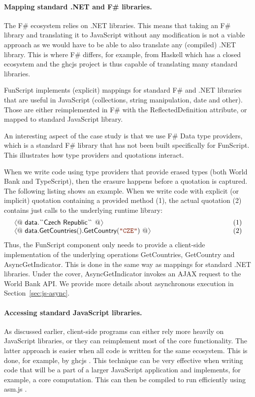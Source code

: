 \documentclass[submission,copyright,creativecommons]{eptcs}
\newcommand{\langl}{\begin{picture}(4.5,7)
\put(1.1,2.5){\rotatebox{60}{\line(1,0){5.5}}}
\put(1.1,2.5){\rotatebox{300}{\line(1,0){5.5}}}
\end{picture}}
\newcommand{\rangl}{\begin{picture}(4.5,7)
\put(.9,2.5){\rotatebox{120}{\line(1,0){5.5}}}
\put(.9,2.5){\rotatebox{240}{\line(1,0){5.5}}}
\end{picture}}
\newcommand{\str}[1]{\textnormal{\textcolor{strclr}{\ttfamily "#1"}}}
\newcommand{\ident}[1]{\textnormal{\sffamily #1}}
\newcommand{\lident}[1]{\textnormal{\sffamily
  \`{}\hspace{-0.25em}\`{}\hspace{-0.1em}#1\`{}\hspace{-0.25em}\`{}}}
\begin{document}
\paragraph{Mapping standard .NET and F\# libraries.}
The F\# ecosystem relies on .NET libraries. This means that taking an F\# library and translating it
to JavaScript without any modification is not a viable approach as we would have to be able to also
translate any (compiled) .NET library. This is where F\# differs, for example, from Haskell which has
a closed ecosystem and the ghcjs project \cite{haskell-ghcjs} is thus capable of translating many
standard libraries.

FunScript implements (explicit) mappings for standard F\# and .NET libraries that are useful in
JavaScript (collections, string manipulation, date and other). Those are either reimplemented in
F\# with the \ident{ReflectedDefinition} attribute, or mapped to standard JavaScript library.

An interesting aspect of the case study is that we use F\# Data \cite{fsharp-data} type providers,
which is a standard F\# library that has not been built specifically for FunScript. This illustrates
how type providers and quotations interact.

When we write code using type providers that provide erased types (both World Bank and TypeScript),
then the erasure happens before a quotation is captured. The following listing shows an example.
When we write code with explicit (or implicit) quotation containing a provided method (1), the actual
quotation (2) contains just calls to the underlying runtime library:
%
\begin{equation*}
\begin{array}{llr}
 \langl @~\ident{data.}\lident{Czech Republic}~@\rangl &\hspace{10em}& (1)\\
 \langl @~\ident{data.GetCountries}().\ident{GetCountry}(\str{CZE}) ~@\rangl  && (2)
\end{array}
\end{equation*}
%
Thus, the FunScript component only needs to provide a client-side implementation of the underlying
operations \ident{GetCountries}, \ident{GetCountry} and \ident{AsyncGetIndicator}. This is done in the
same way as mappings for standard .NET libraries. Under the cover, \ident{AsyncGetIndicator} invokes
an AJAX request to the World Bank API. We provide more details about asynchronous execution in
Section~\ref{sec:js-async}.

\paragraph{Accessing standard JavaScript libraries.}
As discussed earlier, client-side programs can either rely more heavily on JavaScript libraries,
or they can reimplement most of the core functionality. The latter approach is easier when all code
is written for the same ecosystem. This is done, for example, by ghcjs \cite{haskell-ghcjs}.
This technique can be very effective when writing code that will be a part of a larger JavaScript
application and implements, for example, a core computation. This can then be compiled to run
efficiently using asm.js \cite{asm-js}.
\end{document}
